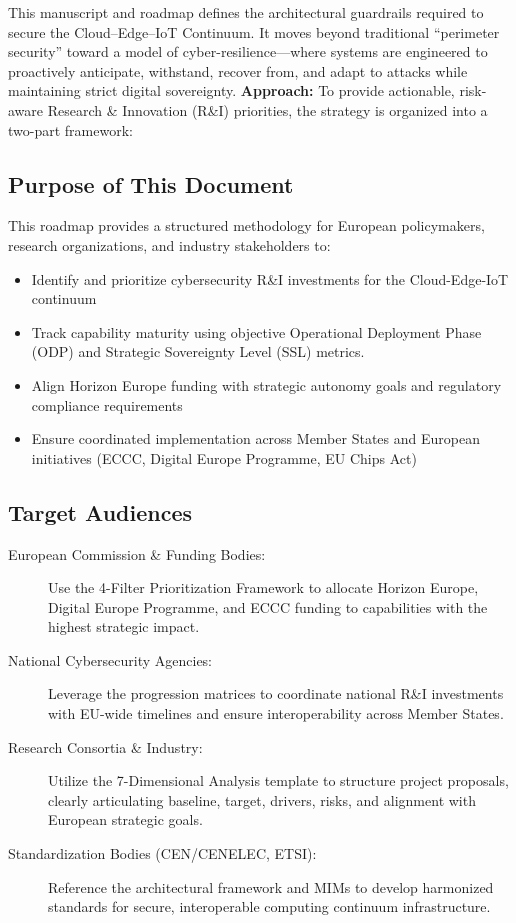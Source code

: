 \noindent
This manuscript and roadmap defines the architectural guardrails required to secure the Cloud--Edge--IoT Continuum. It moves beyond traditional ``perimeter security'' toward a model of cyber-resilience---where systems are engineered to proactively anticipate, withstand, recover from, and adapt to attacks while maintaining strict digital sovereignty.
\textbf{Approach:} To provide actionable, risk-aware Research \& Innovation (R\&I) priorities, the strategy is organized into a two-part framework:
 

\subsection*{Purpose of This Document}
This roadmap provides a structured methodology for European policymakers, research organizations, and industry stakeholders to:
\begin{itemize}
    \item Identify and prioritize cybersecurity R\&I investments for the Cloud-Edge-IoT continuum
\item Track capability maturity using objective Operational Deployment Phase (ODP) and Strategic Sovereignty Level (SSL) metrics.
    \item Align Horizon Europe funding with strategic autonomy goals and regulatory compliance requirements
    \item Ensure coordinated implementation across Member States and European initiatives (ECCC, Digital Europe Programme, EU Chips Act)
\end{itemize}

\subsection*{Target Audiences}
\begin{description}
    \item[European Commission \& Funding Bodies:] Use the 4-Filter Prioritization Framework to allocate Horizon Europe, Digital Europe Programme, and ECCC funding to capabilities with the highest strategic impact.
    
    \item[National Cybersecurity Agencies:] Leverage the progression matrices to coordinate national R\&I investments with EU-wide timelines and ensure interoperability across Member States.
    
    \item[Research Consortia \& Industry:] Utilize the 7-Dimensional Analysis template to structure project proposals, clearly articulating baseline, target, drivers, risks, and alignment with European strategic goals.
    
    \item[Standardization Bodies (CEN/CENELEC, ETSI):] Reference the architectural framework and MIMs to develop harmonized standards for secure, interoperable computing continuum infrastructure.
\end{description}

